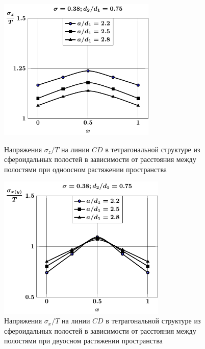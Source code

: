 %

\begin{figure}[h!]
\centering\footnotesize
\parbox[b]{7.5cm}{\centering\includegraphics[width=7.5cm]{cav8-a-d75-t1-sig_z-cd.pdf}
\caption{Напряжения $\sigma_z/T$ на линии $CD$ в тетрагональной структуре из сфероидальных полостей в зависимости от расстояния между полостями при одноосном растяжении пространства
\label{f:9:15}}}\hfil\hfil
\parbox[b]{7.5cm}{\centering\includegraphics[width=8cm]{cav8-a-d75-t2-sig_x-cd.pdf}
\caption{Напряжения $\sigma_x/T$ на линии $CD$ в тетрагональной структуре из сфероидальных полостей в зависимости от расстояния между полостями при двуосном растяжении пространства
\label{f:9:16}}}
\end{figure}

